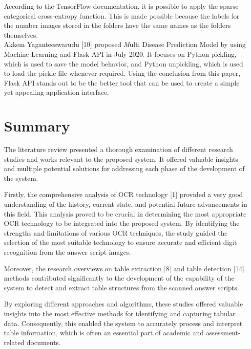 \noindent
According to the TensorFlow documentation, it is possible to apply the sparse categorical cross-entropy function. This is made possible because the labels for the number images stored in the folders have the same names as the folders themselves. \\

\noindent
Akkem Yaganteeswarudu [10] proposed {\textit Multi Disease Prediction Model by using Machine Learning and Flask API} in July 2020. 
\noindent
It focuses on Python pickling, which is used to save the model behavior, and Python unpickling, which is used to load the pickle file whenever required. Using the conclusion from this paper, Flask API stands out to be the better tool that can be used to create a simple yet appealing application interface.


\section{Summary}

\noindent 
The literature review presented a thorough examination of different research studies and works relevant to the proposed system. It offered valuable insights and multiple potential solutions for addressing each phase of the development of the system.

\vspace{3mm}

\noindent
Firstly, the comprehensive analysis of OCR technology [1] provided a very good understanding of the history, current state, and potential future advancements in this field. This analysis proved to be crucial in determining the most appropriate OCR technology to be integrated into the proposed system. By identifying the strengths and limitations of various OCR techniques, the study guided the selection of the most suitable technology to ensure accurate and efficient digit recognition from the answer script images.

\vspace{3mm}

\noindent
Moreover, the research overviews on table extraction [8] and table detection [14] methods contributed significantly to the development of the capability of the system to detect and extract table structures from the scanned answer scripts.

\clearpage

\noindent
By exploring different approaches and algorithms, these studies offered valuable insights into the most effective methods for identifying and capturing tabular data. Consequently, this enabled the system to accurately process and interpret table information, which is often an essential part of academic and assessment-related documents.

